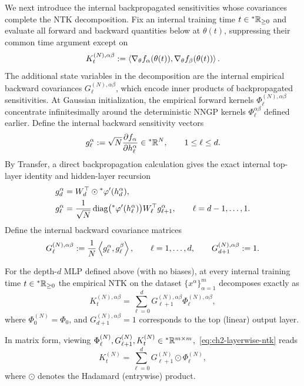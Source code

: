 We next introduce the internal backpropagated sensitivities whose covariances complete the NTK decomposition. Fix an internal training time $t \in {}^*\mathbb{R}_{\ge 0}$ and evaluate all forward and backward quantities below at $\theta(t)$, suppressing their common time argument except on
\begin{equation}\label{eq:ch2-deep-ntk-def}
K_t^{(N),\alpha\beta} := \left\langle \nabla_\theta f_\alpha(\theta(t)), \nabla_\theta f_\beta(\theta(t)) \right\rangle.
\end{equation}
The additional state variables in the decomposition are the internal empirical backward covariances $G_\ell^{(N),\alpha\beta}$, which encode inner products of backpropagated sensitivities. At Gaussian initialization, the empirical forward kernels $\Phi_\ell^{(N),\alpha\beta}$ concentrate infinitesimally around the deterministic NNGP kernels $\Phi_\ell^{\alpha\beta}$ defined earlier. Define the internal backward sensitivity vectors
\begin{equation}\label{eq:ch2-g-def}
g_\ell^\alpha := \sqrt{N} \frac{\partial f_\alpha}{\partial h_\ell^\alpha} \in {}^*\mathbb{R}^N, \qquad 1 \le \ell \le d.
\end{equation}
By Transfer, a direct backpropagation calculation gives the exact internal top-layer identity and hidden-layer recursion
\begin{align}
g_d^\alpha &= W_d^\top \odot {}^*\varphi'(h_d^\alpha), \label{eq:ch2-gd-top} \\
g_\ell^\alpha &= \frac{1}{\sqrt{N}} \operatorname{diag}\bigl({}^*\varphi'(h_\ell^\alpha)\bigr) W_\ell^\top g_{\ell+1}^\alpha, \qquad \ell = d-1, \dots, 1. \label{eq:ch2-gell-rec}
\end{align}
Define the internal backward covariance matrices
\begin{equation}\label{eq:ch2-G-emp}
G_\ell^{(N),\alpha\beta} := \frac{1}{N} \left\langle g_\ell^\alpha, g_\ell^\beta \right\rangle, \qquad \ell = 1, \dots, d, \qquad G_{d+1}^{(N),\alpha\beta} := 1.
\end{equation}

\begin{proposition}\label{prop:ch2-layerwise-ntk}
For the depth-$d$ MLP defined above (with no biases), at every internal training time $t \in {}^*\mathbb{R}_{\ge 0}$ the empirical NTK on the dataset $\{x^\alpha\}_{\alpha=1}^{m}$ decomposes exactly as
\begin{equation}\label{eq:ch2-layerwise-ntk}
K_t^{(N),\alpha\beta} = \sum_{\ell=0}^{d} G_{\ell+1}^{(N),\alpha\beta} \Phi_\ell^{(N),\alpha\beta},
\end{equation}
where $\Phi_0^{(N)} = \Phi_0$, and $G_{d+1}^{(N),\alpha\beta} = 1$ corresponds to the top (linear) output layer.

In matrix form, viewing $\Phi_\ell^{(N)}, G_{\ell+1}^{(N)}, K_t^{(N)} \in {}^*\mathbb{R}^{m \times m}$,~\eqref{eq:ch2-layerwise-ntk} reads
\begin{equation}\label{eq:ch2-layerwise-ntk-hadamard}
K_t^{(N)} = \sum_{\ell=0}^{d} G_{\ell+1}^{(N)} \odot \Phi_\ell^{(N)},
\end{equation}
where $\odot$ denotes the Hadamard (entrywise) product.
\end{proposition}

